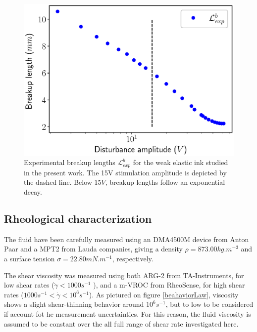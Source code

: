 \documentclass[onecolumn, 12pt]{asme2ej}
\begin{document}
\begin{figure}[h]
    \centering
    \includegraphics[width=15cm]{Figures/Fig3.eps}
    \caption{Experimental breakup lengths $\mathcal{L}^b_{exp}$ for the weak elastic ink studied in the present work. The 15V stimulation amplitude is depicted by the dashed line. Below $15V$, breakup lengths follow an exponential decay.}
    \label{fig:LbInk}
\end{figure}

\subsection{Rheological characterization}\label{sec:rheo}

The fluid have been carefully measured using an DMA4500M device from Anton Paar and a MPT2 from Lauda companies, giving a density $\rho = 873.00 kg.m^{-3}$ and a surface tension $\sigma = 22.80 mN.m^{-1}$, respectively. 

The shear viscosity was measured using both ARG-2 from TA-Instruments, for low shear rates ($\dot{\gamma} < 1000 s^{-1}$ ), and a m-VROC from RheoSense, for high shear rates ($1000 s^{-1}<\dot{\gamma} < 10^6 s^{-1}$). As pictured on figure \ref{beahaviorLaw}, viscosity shows a slight shear-thinning behavior around $10^6s^{-1}$, but to low to be considered if account fot he measurement uncertainties. For this reason, the fluid viscosity is assumed to be constant over the all full range of shear rate investigated here.
\end{document}
